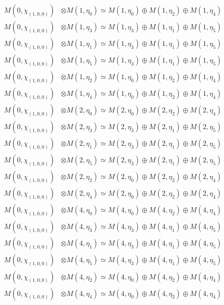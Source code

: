 \begin{align*}
M(0,\chi_{(1,0,0)}) &\otimes M(1,\eta_{0}) \simeq M(1,\eta_{0}) \oplus M(1,\eta_{2}) \oplus M(1,\eta_{4})\\
M(0,\chi_{(1,0,0)}) &\otimes M(1,\eta_{3}) \simeq M(1,\eta_{3}) \oplus M(1,\eta_{1}) \oplus M(1,\eta_{5})\\
M(0,\chi_{(1,0,0)}) &\otimes M(1,\eta_{1}) \simeq M(1,\eta_{3}) \oplus M(1,\eta_{1}) \oplus M(1,\eta_{5})\\
M(0,\chi_{(1,0,0)}) &\otimes M(1,\eta_{5}) \simeq M(1,\eta_{3}) \oplus M(1,\eta_{1}) \oplus M(1,\eta_{5})\\
M(0,\chi_{(1,0,0)}) &\otimes M(1,\eta_{2}) \simeq M(1,\eta_{0}) \oplus M(1,\eta_{2}) \oplus M(1,\eta_{4})\\
M(0,\chi_{(1,0,0)}) &\otimes M(1,\eta_{4}) \simeq M(1,\eta_{0}) \oplus M(1,\eta_{2}) \oplus M(1,\eta_{4})\\
M(0,\chi_{(1,0,0)}) &\otimes M(2,\eta_{0}) \simeq M(2,\eta_{0}) \oplus M(2,\eta_{2}) \oplus M(2,\eta_{4})\\
M(0,\chi_{(1,0,0)}) &\otimes M(2,\eta_{3}) \simeq M(2,\eta_{3}) \oplus M(2,\eta_{1}) \oplus M(2,\eta_{5})\\
M(0,\chi_{(1,0,0)}) &\otimes M(2,\eta_{1}) \simeq M(2,\eta_{3}) \oplus M(2,\eta_{1}) \oplus M(2,\eta_{5})\\
M(0,\chi_{(1,0,0)}) &\otimes M(2,\eta_{5}) \simeq M(2,\eta_{3}) \oplus M(2,\eta_{1}) \oplus M(2,\eta_{5})\\
M(0,\chi_{(1,0,0)}) &\otimes M(2,\eta_{2}) \simeq M(2,\eta_{0}) \oplus M(2,\eta_{2}) \oplus M(2,\eta_{4})\\
M(0,\chi_{(1,0,0)}) &\otimes M(2,\eta_{4}) \simeq M(2,\eta_{0}) \oplus M(2,\eta_{2}) \oplus M(2,\eta_{4})\\
M(0,\chi_{(1,0,0)}) &\otimes M(4,\eta_{0}) \simeq M(4,\eta_{0}) \oplus M(4,\eta_{2}) \oplus M(4,\eta_{4})\\
M(0,\chi_{(1,0,0)}) &\otimes M(4,\eta_{3}) \simeq M(4,\eta_{3}) \oplus M(4,\eta_{1}) \oplus M(4,\eta_{5})\\
M(0,\chi_{(1,0,0)}) &\otimes M(4,\eta_{1}) \simeq M(4,\eta_{3}) \oplus M(4,\eta_{1}) \oplus M(4,\eta_{5})\\
M(0,\chi_{(1,0,0)}) &\otimes M(4,\eta_{5}) \simeq M(4,\eta_{3}) \oplus M(4,\eta_{1}) \oplus M(4,\eta_{5})\\
M(0,\chi_{(1,0,0)}) &\otimes M(4,\eta_{2}) \simeq M(4,\eta_{0}) \oplus M(4,\eta_{2}) \oplus M(4,\eta_{4})\\
M(0,\chi_{(1,0,0)}) &\otimes M(4,\eta_{4}) \simeq M(4,\eta_{0}) \oplus M(4,\eta_{2}) \oplus M(4,\eta_{4})\\

\end{align*}
